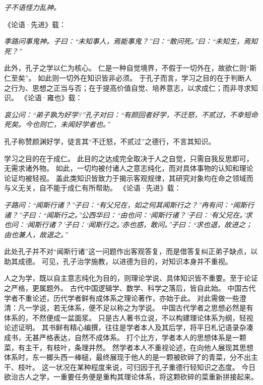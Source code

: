 \documentclass[11pt]{article}
\begin{document}
\textit{子不语怪力乱神。}

《论语·先进》载：

\textit{季路问事鬼神。子曰：“未知事人，焉能事鬼？”曰：“敢问死。”曰：“未知生，焉知死？”}

\newline

此外，孔子之学以仁为核心。
仁是一种自觉境界，不假于一切外在，故欲仁则“斯仁至矣”。
如此则一切外在知识皆非必须。
于孔子而言，学习之目的在于判断人之行为、思想之正当与否；在于提高价值自觉、培养意志，以求成仁；而非寻求知识。
《论语·雍也》载：

\textit{哀公问：“弟子孰为好学?”孔子对曰：“有颜回者好学，不迁怒，不贰过，不幸短命死矣。今也则亡，未闻好学者也。”}

孔子称赞颜渊好学，徒言其“不迁怒，不贰过”之德行，不言其知识。

\newline

学习之目的在于成仁。
此目的之达成完全取决于人之自觉，只需自我反思即可，无需求诸外物。
如此，一切均被付诸人之意志纯化，而对具体事物的认知和理论论证均被轻视。
盖此类知识皆致力于揭示客观规律，其研究对象均在命之领域而与义无关，自不能于成仁有所帮助。
《论语·先进》载：

\textit{子路问：“闻斯行诸？”子曰：“有父兄在，如之何其闻斯行之？”冉有问：“闻斯行诸？”子曰：“闻斯行之。”公西华曰：“由也问：‘闻斯行诸？’子曰：‘有父兄在。’求也问：‘闻斯行诸？’子曰：‘闻斯行之。’赤也惑，敢问。”子曰：“求也退，故进之；由也兼人，故退之。”}

此处孔子并不对“闻斯行诸”这一问题作出客观答复，而是借答复纠正弟子缺点，以助其成德。
可见，孔子治学施教，以进德为目的，对知识本身并不重视。

\newline

人之为学，既以自主意志纯化为目的，则理论学说、具体知识皆不重要。至于论证之严格，更属题外。
古代中国逻辑学、数学、科学之落后，皆自此始。
中国古代学者不重论述，历代学者鲜有成体系之理论著作，亦始于此。
对此需做一些澄清：凡一学说，若无体系，便不足以称之为学说。
中国古代学者之思想必然是有体系的，不然便成一盆面浆。
只是古人著书立说，不以构建理论体系为纲，轻视论述证明。
其书鲜有精心编撰，往往是学者本人及其后学，将平日札记语录杂凑成书，无甚严格表达，自然不成体系。
打个比方，学者本人的思想体系是一颗菜，有主干，有枝叶，条理井然。
然学者本人不重视论述，在向他人展现其思想体系时，东一榔头西一棒槌，最终展现于他人的是一颗被砍碎了的青菜，分不出主干、枝叶。
这一状况在某种程度来说，可归因于孔子重德行轻知识之态度。
今日欲治古人之学，一重要任务便是重构其理论体系，将这颗砍碎的菜重新拼接起来。
  
\end{document}
